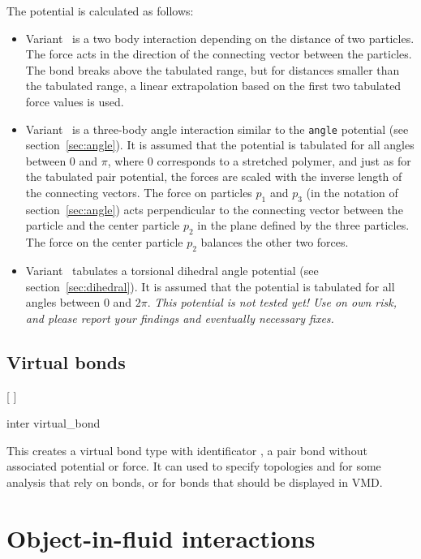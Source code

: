The potential is calculated as follows:
\begin{itemize}
\item Variant~ is a two body interaction depending on the distance of
  two particles. The force acts in the direction of the connecting vector
  between the particles. The bond breaks above the tabulated range, but for
  distances smaller than the tabulated range, a linear extrapolation based on
  the first two tabulated force values is used.
\item Variant~ is a three-body angle interaction similar to the
  \texttt{angle} potential (see section~\ref{sec:angle}).  It is assumed that
  the potential is tabulated for all angles between 0 and $ \pi $, where 0
  corresponds to a stretched polymer, and just as for the tabulated pair
  potential, the forces are scaled with the inverse length of the connecting
  vectors. The force on particles $p_1$ and $p_3$ (in the notation of
  section~\ref{sec:angle}) acts perpendicular to the connecting vector between
  the particle and the center particle $p_2$ in the plane defined by the three
  particles. The force on the center particle $p_2$ balances the other two
  forces.
\item Variant~ tabulates a torsional dihedral angle potential (see
  section~\ref{sec:dihedral}). It is assumed that the potential is tabulated for
  all angles between 0 and $2\pi$. \em{This potential is not tested yet! Use on
    own risk, and please report your findings and eventually necessary fixes.}
\end{itemize}

\subsection{Virtual bonds}
\begin{pysyntax}
  [
  ]
\end{pysyntax}
\begin{essyntax}
  inter  virtual_bond
\end{essyntax}

This creates a virtual bond type with identificator , \ie
a pair bond without associated potential or force. It can used to specify
topologies and for some analysis that rely on bonds, or \eg for bonds that
should be displayed in VMD.

\section{Object-in-fluid interactions}
\label{sec:inter-bonded-oif}

